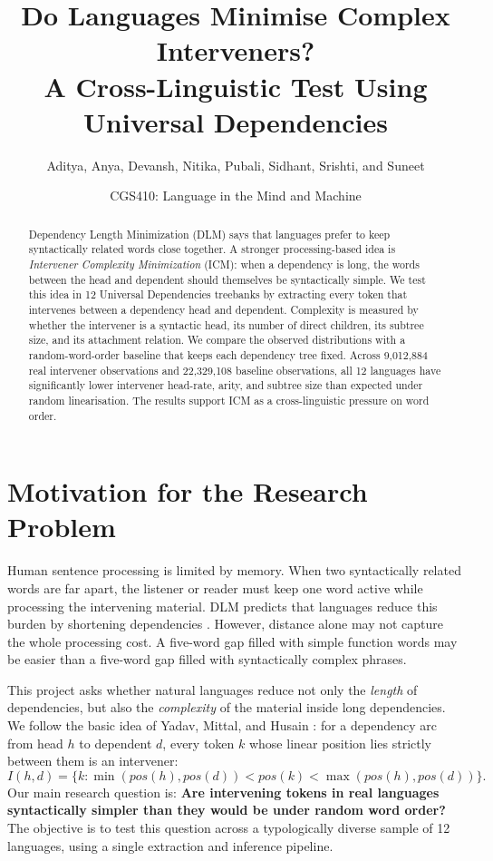 \documentclass[11pt]{article}
\title{\vspace{-1.4cm}\textbf{Do Languages Minimise Complex Interveners?}\\
\large A Cross-Linguistic Test Using Universal Dependencies}
\author{Aditya, Anya, Devansh, Nitika, Pubali, Sidhant, Srishti, and Suneet}
\date{CGS410: Language in the Mind and Machine}
\begin{document}
\maketitle
\vspace{-0.6cm}

\begin{abstract}
Dependency Length Minimization (DLM) says that languages prefer to keep syntactically related words close together. A stronger processing-based idea is \emph{Intervener Complexity Minimization} (ICM): when a dependency is long, the words between the head and dependent should themselves be syntactically simple. We test this idea in 12 Universal Dependencies treebanks by extracting every token that intervenes between a dependency head and dependent. Complexity is measured by whether the intervener is a syntactic head, its number of direct children, its subtree size, and its attachment relation. We compare the observed distributions with a random-word-order baseline that keeps each dependency tree fixed. Across 9,012,884 real intervener observations and 22,329,108 baseline observations, all 12 languages have significantly lower intervener head-rate, arity, and subtree size than expected under random linearisation. The results support ICM as a cross-linguistic pressure on word order.
\end{abstract}

\section{Motivation for the Research Problem}
Human sentence processing is limited by memory. When two syntactically related words are far apart, the listener or reader must keep one word active while processing the intervening material. DLM predicts that languages reduce this burden by shortening dependencies \cite{gibson1998linguistic,liu2008dependency}. However, distance alone may not capture the whole processing cost. A five-word gap filled with simple function words may be easier than a five-word gap filled with syntactically complex phrases.

This project asks whether natural languages reduce not only the \emph{length} of dependencies, but also the \emph{complexity} of the material inside long dependencies. We follow the basic idea of Yadav, Mittal, and Husain \cite{yadav2022reappraisal}: for a dependency arc from head $h$ to dependent $d$, every token $k$ whose linear position lies strictly between them is an intervener:
\[
I(h,d)=\{k:\min(pos(h),pos(d))<pos(k)<\max(pos(h),pos(d))\}.
\]
Our main research question is: \textbf{Are intervening tokens in real languages syntactically simpler than they would be under random word order?} The objective is to test this question across a typologically diverse sample of 12 languages, using a single extraction and inference pipeline.
\end{document}
